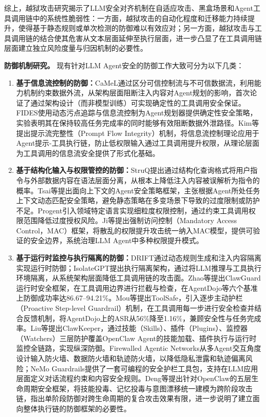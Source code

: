 综上，越狱攻击研究揭示了LLM安全对齐机制在自适应攻击、黑盒场景和Agent工具调用链中的系统性脆弱性：一方面，越狱攻击的自动化程度和迁移能力持续提升，使得基于静态规则或单次检测的防御难以有效应对；另一方面，越狱攻击与工具调用链的结合使其危害从文本层面延伸至执行层面，进一步凸显了在工具调用链层面建立独立风险度量与归因机制的必要性。

\textbf{防御机制研究。}
现有针对LLM Agent安全的防御工作大致可分为以下几类：
\begin{enumerate}
  \item \textbf{基于信息流控制的防御：}CaMeL\cite{debenedetti2025camel}通过区分可信控制流与不可信数据流，利用能力机制约束数据外流，从架构层面阻断注入内容对Agent规划的影响，首次论证了通过架构设计（而非模型训练）可实现确定性的工具调用安全保证。FIDES\cite{costa2025fides}使用动态污点追踪与信息流控制为Agent规划器提供确定性安全策略，实验表明其在保持较高任务完成率的同时能够有效阻断数据外泄路径。Kim等\cite{kim2025promptflow}提出提示流完整性（Prompt Flow Integrity）机制，将信息流控制理论应用于Agent提示-工具执行链，防止低权限输入通过工具调用提升权限，从理论层面为工具调用的信息流安全提供了形式化基础。
  \item \textbf{基于结构化输入与权限管控的防御：}StruQ\cite{chen2025struq}提出通过结构化查询格式将用户指令与外部数据内容在语法层面分离，从根本上降低注入内容被误解析为指令的概率。Tsai等\cite{tsai2025contextual}提出面向上下文的Agent安全策略框架，主张根据Agent所处任务上下文动态匹配安全策略，避免静态策略在多变场景下导致的过度限制或防护不足。Progent\cite{shi2025progent}引入领域特定语言实现细粒度权限控制，通过约束工具调用权限范围降低过度授权风险。Ji等\cite{ji2026seagent}提出强制访问控制（Mandatory Access Control，MAC）框架，将散乱的权限提升攻击统一纳入MAC模型，提供可验证的安全边界，系统治理LLM Agent中多种权限提升模式。
  \item \textbf{基于运行时监控与执行隔离的防御：}DRIFT\cite{li2025drift}通过动态规则生成和注入内容隔离实现运行时防御；IsolateGPT\cite{wu2025isolategpt}提出执行隔离架构，通过将LLM推理与工具执行环境隔离，从系统架构层面降低工具调用链的攻击面。Zhao等\cite{zhao2026clawguard}提出ClawGuard运行时安全框架，在工具调用边界进行拦截与检查，在AgentDojo等六个基准上防御成功率达86.67--94.21\%。Mou等\cite{mou2026toolsafe}提出ToolSafe，引入逐步主动护栏（Proactive Step-level Guardrail）机制，在工具调用每一步进行安全检查并结合反馈机制，将AgentDojo上的ASR从56\%降至1.16\%，兼顾安全性与任务完成率。Liu等\cite{liu2026clawkeeper}提出ClawKeeper，通过技能（Skills）、插件（Plugins）、监控器（Watchers）三层防护覆盖OpenClaw Agent的技能加载、插件执行与运行时监控全链路，实现纵深防御。Firewalled Agentic Networks\cite{abdelnabi2025firewalls}从多Agent交互角度设计输入防火墙、数据防火墙和轨迹防火墙，以降低隐私泄露和轨迹偏离风险；NeMo Guardrails\cite{rebedea2023nemo}提供了一套可编程的安全护栏工具包，支持在LLM应用层面定义对话流程约束和内容安全规则。Deng等\cite{deng2026tamingopenclaw}提出针对OpenClaw的五层生命周期安全框架，将技能投毒、记忆投毒与意图漂移统一建模为跨阶段攻击链，指出单阶段防御对跨生命周期的复合攻击效果有限，进一步说明了建立面向整体执行链的防御框架的必要性。

\end{enumerate}
